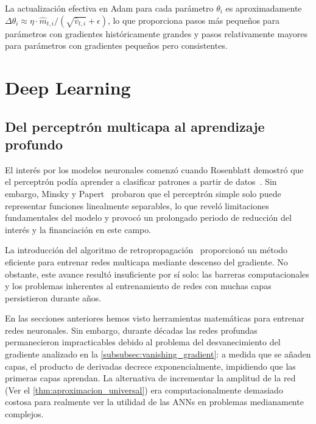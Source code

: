 La actualización efectiva en \gls{Adam} para cada parámetro \(\theta_i\) es aproximadamente \(\Delta\theta_i \approx \eta \cdot \hat{m}_{t,i} / (\sqrt{\hat{v}_{t,i}} + \epsilon)\), lo que proporciona pasos más pequeños para parámetros con gradientes históricamente grandes y pasos relativamente mayores para parámetros con gradientes pequeños pero consistentes.

\section{Deep Learning}

\subsection{Del perceptrón multicapa al aprendizaje profundo}

El interés por los modelos neuronales comenzó cuando Rosenblatt demostró que el perceptrón podía aprender a clasificar patrones a partir de datos~\citep{rosenblatt1958perceptron}. Sin embargo, Minsky y Papert~\citep{minsky1969perceptrons} probaron que el perceptrón simple solo puede representar funciones linealmente separables, lo que reveló limitaciones fundamentales del modelo y provocó un prolongado periodo de reducción del interés y la financiación en este campo.

La introducción del algoritmo de retropropagación~\citep{backpropagation} proporcionó un método eficiente para entrenar redes multicapa mediante descenso del gradiente. No obstante, este avance resultó insuficiente por sí solo: las barreras computacionales y los problemas inherentes al entrenamiento de redes con muchas capas persistieron durante años.

En las secciones anteriores hemos visto herramientas matemáticas para entrenar redes neuronales. Sin embargo, durante décadas las redes profundas permanecieron impracticables debido al problema del desvanecimiento del gradiente analizado en la \autoref{subsubsec:vanishing_gradient}: a medida que se añaden capas, el producto de derivadas decrece exponencialmente, impidiendo que las primeras capas aprendan. La alternativa de incrementar la amplitud de la red (Ver el \autoref{thm:aproximacion_universal}) era computacionalmente demasiado costosa para realmente ver la utilidad de las \glspl{ANN} en problemas medianamente complejos.

